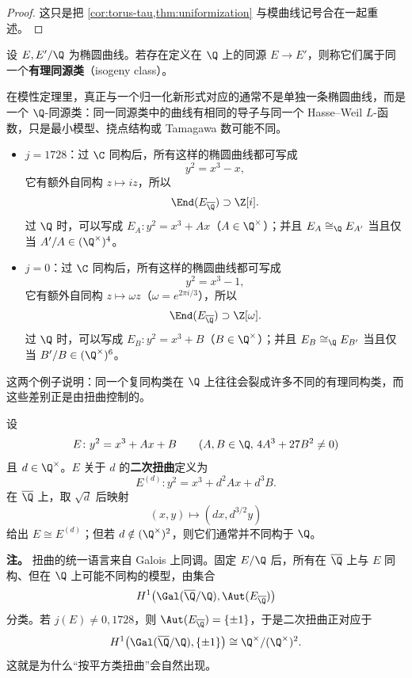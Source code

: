 \begin{proof}
这只是把 \cref{cor:torus-tau,thm:uniformization} 与模曲线记号合在一起重述。
\end{proof}

\begin{definition}[有理同源类]
\label{def:q-isogeny-class}
设 $E,E'/\Q$ 为椭圆曲线。若存在定义在 $\Q$ 上的同源 $E\to E'$，则称它们属于同一个\textbf{有理同源类}（isogeny class）。
\end{definition}

在模性定理里，真正与一个归一化新形式对应的通常不是单独一条椭圆曲线，而是一个 $\Q$-同源类：同一同源类中的曲线有相同的导子与同一个 Hasse--Weil $L$-函数，只是最小模型、挠点结构或 Tamagawa 数可能不同。

\begin{example}[两个特殊的 $j$ 值]
\label{ex:j0-j1728}
\leavevmode
\begin{itemize}
  \item $j=1728$：过 $\C$ 同构后，所有这样的椭圆曲线都可写成
    \[
      y^2=x^3-x,
    \]
    它有额外自同构 $z\mapsto iz$，所以
    \[
      \End(E_{\overline{\Q}})\supset \Z[i].
    \]
    过 $\Q$ 时，可以写成 $E_A\colon y^2=x^3+Ax$（$A\in \Q^\times$）；并且 $E_A\cong_{\Q}E_{A'}$ 当且仅当 $A'/A\in (\Q^\times)^4$。
  \item $j=0$：过 $\C$ 同构后，所有这样的椭圆曲线都可写成
    \[
      y^2=x^3-1,
    \]
    它有额外自同构 $z\mapsto \omega z$（$\omega=e^{2\pi i/3}$），所以
    \[
      \End(E_{\overline{\Q}})\supset \Z[\omega].
    \]
    过 $\Q$ 时，可以写成 $E_B\colon y^2=x^3+B$（$B\in \Q^\times$）；并且 $E_B\cong_{\Q}E_{B'}$ 当且仅当 $B'/B\in (\Q^\times)^6$。
\end{itemize}

这两个例子说明：同一个复同构类在 $\Q$ 上往往会裂成许多不同的有理同构类，而这些差别正是由扭曲控制的。
\end{example}

\begin{definition}[二次扭曲]
\label{def:quadratic-twist}
设
\[
  E\colon y^2=x^3+Ax+B
  \qquad (A,B\in \Q,\,4A^3+27B^2\neq 0)
\]
且 $d\in \Q^\times$。$E$ 关于 $d$ 的\textbf{二次扭曲}定义为
\[
  E^{(d)}\colon y^2=x^3+d^2Ax+d^3B.
\]
在 $\overline{\Q}$ 上，取 $\sqrt d$ 后映射
\[
  (x,y)\longmapsto (dx,d^{3/2}y)
\]
给出 $E\cong E^{(d)}$；但若 $d\notin (\Q^\times)^2$，则它们通常并不同构于 $\Q$。
\end{definition}

\textbf{注。} 扭曲的统一语言来自 Galois 上同调。固定 $E/\Q$ 后，所有在 $\overline{\Q}$ 上与 $E$ 同构、但在 $\Q$ 上可能不同构的模型，由集合
\[
  H^1\bigl(\Gal(\overline{\Q}/\Q),\Aut(E_{\overline{\Q}})\bigr)
\]
分类。若 $j(E)\neq 0,1728$，则 $\Aut(E_{\overline{\Q}})=\{\pm 1\}$，于是二次扭曲正对应于
\[
  H^1\bigl(\Gal(\overline{\Q}/\Q),\{\pm 1\}\bigr)
  \cong \Q^\times/(\Q^\times)^2.
\]
这就是为什么“按平方类扭曲”会自然出现。


